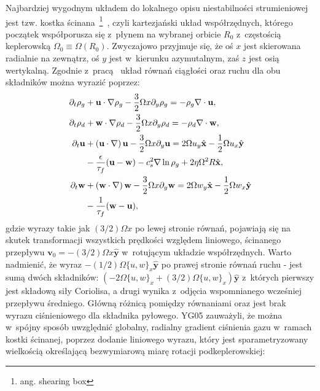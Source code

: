 Najbardziej wygodnym układem do lokalnego opisu niestabilności strumieniowej
jest tzw. kostka ścinana~\footnote{ang. shearing box}~\citep{HGB95}, czyli
kartezjański układ współrzędnych, którego początek współporusza się z~płynem na
wybranej orbicie $R_0$ z~częstością keplerowską $\Omega_0 \equiv
\Omega\left(R_0\right)$. Zwyczajowo przyjmuje się, że oś $x$ jest skierowana
radialnie na zewnątrz, oś $y$ jest w~kierunku azymutalnym, zaś $z$ jest osią
wertykalną. Zgodnie z~pracą~\cite*{YJ07} układ równań ciągłości oraz ruchu dla
obu składników można wyrazić poprzez:
%
\begin{align}
\partial_t \rho_g &+ \mathbf{u}\cdot\nabla\rho_g - \frac{3}{2}\Omega x\partial_y\rho_g 
 = -\rho_g\nabla\cdot\mathbf{u},\label{eqc1}\\
\partial_t \rho_d &+ \mathbf{w}\cdot\nabla\rho_d - \frac{3}{2}\Omega x\partial_y\rho_d 
 = -\rho_d\nabla\cdot\mathbf{w},\label{eqc2}\\
\partial_t \mathbf{u} &+ \left(\mathbf{u}\cdot\nabla\right)\mathbf{u} 
 - \frac{3}{2}\Omega x\partial_y\mathbf{u} 
 = 2\Omega u_y \hat{\mathbf{x}} -\frac{1}{2}\Omega u_x \hat{\mathbf{y}} \notag\\
 &- \frac{\epsilon}{\tau_f}(\mathbf{u}-\mathbf{w}) -c_s^2\nabla\ln\rho_g 
 +2\eta\Omega^2 R \hat{\mathbf{x}},\label{eqm1}\\
\partial_t \mathbf{w} &+ \left(\mathbf{w}\cdot\nabla\right)\mathbf{w} 
 - \frac{3}{2}\Omega x\partial_y\mathbf{w}
 = 2\Omega w_y \hat{\mathbf{x}} -\frac{1}{2}\Omega w_x \hat{\mathbf{y}} \notag\\
 &- \frac{1}{\tau_f}(\mathbf{w}-\mathbf{u}), \label{eqm2}
\end{align}
%
gdzie wyrazy takie jak $(3/2)\Omega x$ po lewej stronie równań, pojawiają się na
skutek transformacji wszystkich prędkości względem liniowego, ścinanego przepływu
$\mathbf{v}_0 = -(3/2)\Omega x \hat{\mathbf{y}}$ w~rotującym układzie
współrzędnych. Warto nadmienić, że wyraz $-(1/2)\Omega \{u,w\}_x
\hat{\mathbf{y}}$ po prawej stronie równań ruchu - jest
sumą dwóch składników: $(-2\Omega \{u,w\}_x + (3/2)\Omega \{u,w\}_x)
\hat{\mathbf{y}}$ z~których pierwszy jest składową siły Coriolisa, a drugi
wynika z~odjęcia wspomnianego wcześniej przepływu średniego. Główną różnicą
pomiędzy równaniami  oraz  jest brak wyrazu ciśnieniowego
dla składnika pyłowego. YG05 zauważyli, że można w~spójny sposób uwzględnić
globalny, radialny gradient ciśnienia gazu w~ramach kostki ścinanej, poprzez
dodanie liniowego wyrazu, który jest sparametryzowany wielkością określającą
bezwymiarową miarę rotacji podkeplerowskiej:


